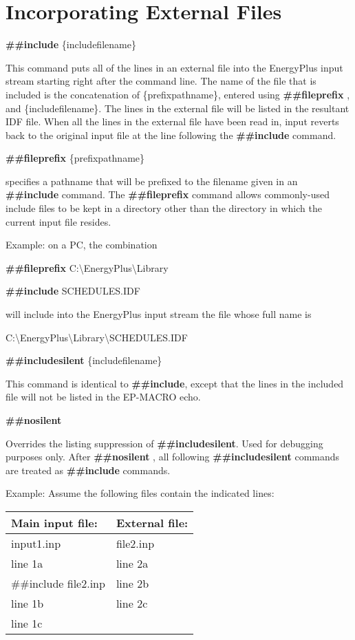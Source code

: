 \section{Incorporating External Files}\label{incorporating-external-files}

\textbf{\#\#include} \{includefilename\}

This command puts all of the lines in an external file into the EnergyPlus input stream starting right after the command line. The name of the file that is included is the concatenation of \{prefixpathname\}, entered using \textbf{\#\#fileprefix} , and \{includefilename\}. The lines in the external file will be listed in the resultant IDF file. When all the lines in the external file have been read in, input reverts back to the original input file at the line following the \textbf{\#\#include} command.

\textbf{\#\#fileprefix} \{prefixpathname\}

specifies a pathname that will be prefixed to the filename given in an \textbf{\#\#include} command. The \textbf{\#\#fileprefix} command allows commonly-used include files to be kept in a directory other than the directory in which the current input file resides.

Example: on a PC, the combination

\textbf{\#\#fileprefix} C:\textbackslash{}EnergyPlus\textbackslash{}Library

\textbf{\#\#include} SCHEDULES.IDF

will include into the EnergyPlus input stream the file whose full name is

C:\textbackslash{}EnergyPlus\textbackslash{}Library\textbackslash{}SCHEDULES.IDF

\textbf{\#\#includesilent} \{includefilename\}

This command is identical to \textbf{\#\#include}, except that the lines in the included file will not be listed in the EP-MACRO echo.

\textbf{\#\#nosilent}

Overrides the listing suppression of \textbf{\#\#includesilent}. Used for debugging purposes only. After \textbf{\#\#nosilent} , all following \textbf{\#\#includesilent} commands are treated as \textbf{\#\#include} commands.

Example: Assume the following files contain the indicated lines:

\begin{longtable}[c]{@{}ll@{}}
\toprule 
Main input file: & External file: \tabularnewline \midrule
\endhead
input1.inp & file2.inp \tabularnewline
line 1a & line 2a \tabularnewline
\#\#include file2.inp & line 2b \tabularnewline
line 1b & line 2c \tabularnewline
line 1c &  \tabularnewline
\bottomrule
\end{longtable}

